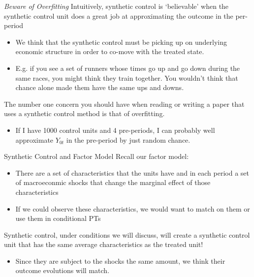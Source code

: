 \documentclass[t]{beamer}
\begin{document}




\begin{frame}{\emph{Beware of Overfitting}}
  Intuitively, synthetic control is `believable' when the synthetic control unit does a great job at approximating the outcome in the per-period
  \begin{itemize}
    \item We think that the synthetic control must be picking up on underlying economic structure in order to co-move with the treated state.
    \item E.g. if you see a set of runners whose times go up and go down during the same races, you might think they train together. You wouldn't think that chance alone made them have the same ups and downs.
  \end{itemize}

  \pause
  \bigskip
  The number one concern you should have when reading or writing a paper that uses a synthetic control method is that of overfitting.
  \begin{itemize}
    \item If I have 1000 control units and 4 pre-periods, I can probably well approximate $Y_{0t}$ in the pre-period by just random chance.
  \end{itemize}
\end{frame}

\begin{frame}{Synthetic Control and Factor Model}
  Recall our factor model:
  \begin{itemize}
    \item There are a set of characteristics that the units have and in each period a set of macroeconmic shocks that change the marginal effect of those characteristics
    \item If we could observe these characteristics, we would want to match on them or use them in conditional PTs
  \end{itemize}

  \pause
  \bigskip
  Synthetic control, under conditions we will discuss, will create a synthetic control unit that has the same average characteristics as the treated unit!
  \begin{itemize}
    \item Since they are subject to the shocks the same amount, we think their outcome evolutions will match.
  \end{itemize}
\end{frame}
\end{document}
